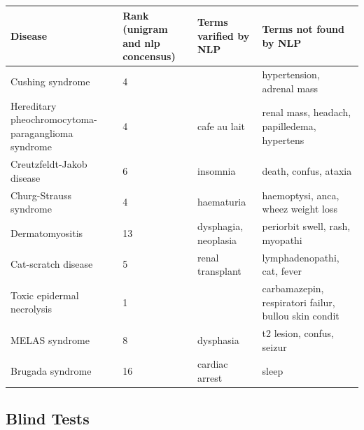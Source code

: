 \documentclass[10pt,letterpaper,final]{article}
\begin{document}
\begin{center}
\begin{small}
	\begin{longtable}{|p{3.5cm}|p{1.5cm}|p{3cm}|p{3cm}|}
	\hline
	\textbf{Disease}  & \textbf{Rank (unigram and nlp concensus)} & \textbf{Terms varified by NLP}  & \textbf{Terms not found by NLP} \\
	\hline\hline
Cushing syndrome & 4 &  & hypertension, adrenal mass \\ \hline
Hereditary pheochromocytoma-paraganglioma syndrome & 4 & cafe au lait & renal mass, headach, papilledema, hypertens \\ \hline
Creutzfeldt-Jakob disease & 6 & insomnia & death, confus, ataxia \\ \hline
Churg-Strauss syndrome & 4 & haematuria &  haemoptysi, anca, wheez weight loss \\ \hline
Dermatomyositis & 13 & dysphagia, neoplasia & periorbit swell, rash, myopathi \\ \hline
Cat-scratch disease & 5 & renal transplant & lymphadenopathi, cat, fever \\ \hline
Toxic epidermal necrolysis & 1 &  & carbamazepin, respiratori failur, bullou skin condit \\ \hline
MELAS syndrome & 8 & dysphasia & t2 lesion, confus, seizur \\ \hline
Brugada syndrome & 16 & cardiac arrest & sleep \\ \hline
	\end{longtable}
\end{small}
\end{center}

\subsection{Blind Tests}
\end{document}
